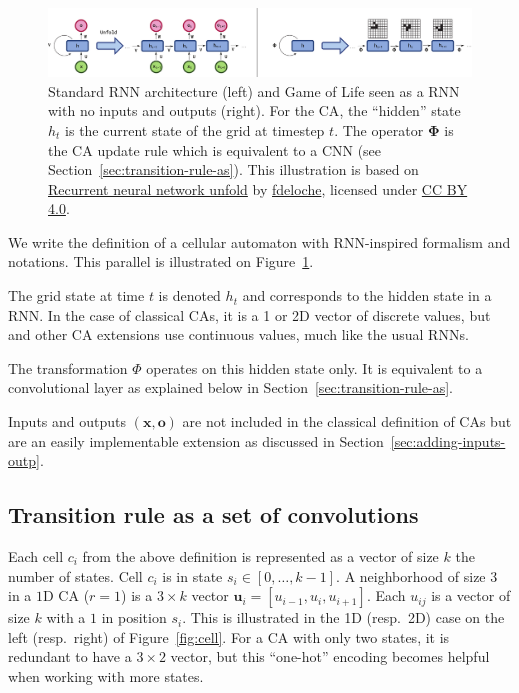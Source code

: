 \begin{figure}[!ht]
  \centering
  \includegraphics[width=\linewidth]{figures/rnn_and_gol.pdf}
  \caption{\label{fig:standard_rnn} Standard RNN architecture (left) and Game of
    Life seen as a RNN with no inputs and outputs (right). For the \ac{CA}, the
    ``hidden'' state $h_t$ is the current state of the grid at timestep $t$. The
    operator $\boldsymbol{\Phi}$ is the \ac{CA} update rule which is
    equivalent to a \ac{CNN} (see Section~\ref{sec:transition-rule-as}). This
    illustration is based on
    \href{https://commons.wikimedia.org/wiki/File:Recurrent_neural_network_unfold.svg}{Recurrent
      neural network unfold} by
    \href{https://commons.wikimedia.org/wiki/User:Ixnay}{fdeloche}, licensed
    under \href{https://creativecommons.org/licenses/by-sa/4.0/}{CC BY 4.0}.}
\end{figure}


We write the definition of a cellular automaton with RNN-inspired formalism and
notations. This parallel is illustrated on Figure~\ref{fig:standard_rnn}.

The grid state at time $t$ is denoted $h_t$ and corresponds to the hidden state
in a RNN\@. In the case of classical CAs, it is a 1 or 2D vector of discrete
values, but~\parencite{mordvintsevGrowingNeuralCellular2020} and other CA
extensions use continuous values, much like the usual RNNs.

The transformation $\Phi$ operates on this hidden state only. It is equivalent
to a convolutional layer as explained below in
Section~\ref{sec:transition-rule-as}.

Inputs and outputs $(\mathbf{x}, \mathbf{o})$ are not included in the classical
definition of CAs but are an easily implementable extension as discussed in
Section~\ref{sec:adding-inputs-outp}.

\subsection{Transition rule as a set of convolutions\label{sec:transition-rule-as}}

Each cell $c_i$ from the above definition is represented as a vector of size $k$
the number of states. Cell $c_i$ is in state $s_i \in [0, \ldots, k - 1]$. A
neighborhood of size $3$ in a $1$D CA ($r=1$) is a $3 \times k$ vector
$\mathbf{u}_i = [u_{i-1}, u_{i}, u_{i+1}]$. Each $u_{ij}$ is a vector of size
$k$ with a $1$ in position $s_i$. This is illustrated in the 1D (resp.\ 2D) case
on the left (resp.\ right) of Figure~\ref{fig:cell}. For a CA with only two
states, it is redundant to have a $3\times 2$ vector, but this ``one-hot'' encoding
becomes helpful when working with more states.

